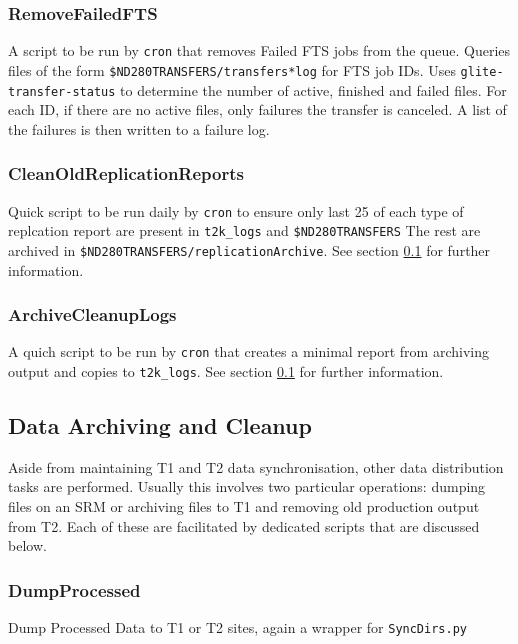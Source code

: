 \documentclass[11pt]{article}
\begin{document}
\subsubsection*{RemoveFailedFTS}
A script to be run by \verb+cron+ that removes Failed FTS jobs from
the queue. Queries files of the form
\verb+$ND280TRANSFERS/transfers*log+ for FTS job IDs. Uses
\verb+glite-transfer-status+ to determine the number of active,
finished and failed files. For each ID, if there are no active files,
only failures the transfer is canceled. A list of the failures is then
written to a failure log.

\subsubsection*{CleanOldReplicationReports}
Quick script to be run daily by \verb+cron+ to ensure only last 25 of
each type of replcation report are present in \verb+t2k_logs+ and
\verb+$ND280TRANSFERS+ The rest are archived in
\verb+$ND280TRANSFERS/replicationArchive+. See section
\ref{subsec:archivingAndCleanup} for further information.
 
\subsubsection*{ArchiveCleanupLogs}
A quich script to be run by \verb+cron+ that creates a minimal report
from archiving output and copies to \verb+t2k_logs+. See section
\ref{subsec:archivingAndCleanup} for further information.

\subsection{Data Archiving and Cleanup}
\label{subsec:archivingAndCleanup}

Aside from maintaining T1 and T2 data synchronisation, other data
distribution tasks are performed. Usually this involves two particular
operations: dumping files on an SRM or archiving files to T1 and
removing old production output from T2. Each of these are facilitated
by dedicated scripts that are discussed below.

\subsubsection*{DumpProcessed}
Dump Processed Data to T1 or T2 sites, again a wrapper for
\verb+SyncDirs.py+
\end{document}
